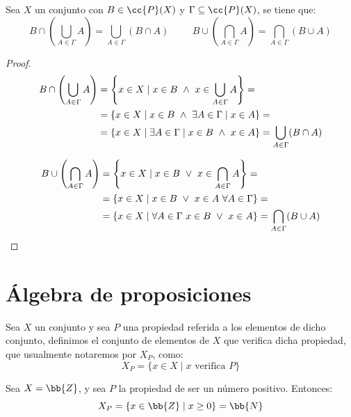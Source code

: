\begin{prop}
    Sea $X$ un conjunto con $B \in \cc{P}(X)$ y $\Gamma \subseteq \cc{P}(X)$, se tiene que:
    \begin{equation*}
        B \cap \left( \bigcup_{A \in \Gamma}A \right) = \bigcup_{A\in \Gamma} (B \cap A)
        \hspace{1cm}
        B \cup \left( \bigcap_{A \in \Gamma}A \right) = \bigcap_{A\in \Gamma} (B \cup A)
    \end{equation*}
\end{prop}
\begin{proof}
    \begin{equation*}
        \begin{split}
            B \cap \left( \bigcup_{A \in \Gamma}A \right) &= \left\{ x \in X \mid x \in B \ \land \  x \in \bigcup_{A \in \Gamma}A \right\} =\\
            & = \{x \in X \mid x \in B \ \land \  \exists A \in \Gamma \mid x \in A\} =\\
            & =\{x \in X \mid \exists A \in \Gamma \mid x \in B \ \land \  x \in A\}= \bigcup_{A\in \Gamma} (B \cap A)
        \end{split}
    \end{equation*}

    \begin{equation*}
        \begin{split}
            B \cup \left( \bigcap_{A \in \Gamma}A \right) &= \left\{ x \in X \mid x \in B \ \lor \  x \in \bigcap_{A \in \Gamma}A \right\} =\\
            & = \{x \in X \mid x \in B \ \lor \  x \in A~\forall A \in \Gamma\} =\\
            & = \{x \in X \mid \forall A \in \Gamma~x \in B \ \lor \  x \in A\} = \bigcap_{A\in \Gamma} (B \cup A)
        \end{split}
    \end{equation*}
\end{proof}


\section{Álgebra de proposiciones}
\begin{definicion}
    Sea $X$ un conjunto y sea $P$ una propiedad referida a los elementos de dicho conjunto, definimos el conjunto de elementos de $X$ que verifica dicha propiedad, que usualmente notaremos por $X_P$, como:
    $$X_P = \{x \in X \mid x \mbox{ verifica } P \}$$
\end{definicion}
\begin{ejemplo}
    Sea $X=\bb{Z}$, y sea $P$ la propiedad de ser un número positivo. Entonces:
    \begin{equation*}
        X_P = \{x\in \bb{Z}\mid x\geq 0\} = \bb{N}
    \end{equation*}
\end{ejemplo}

